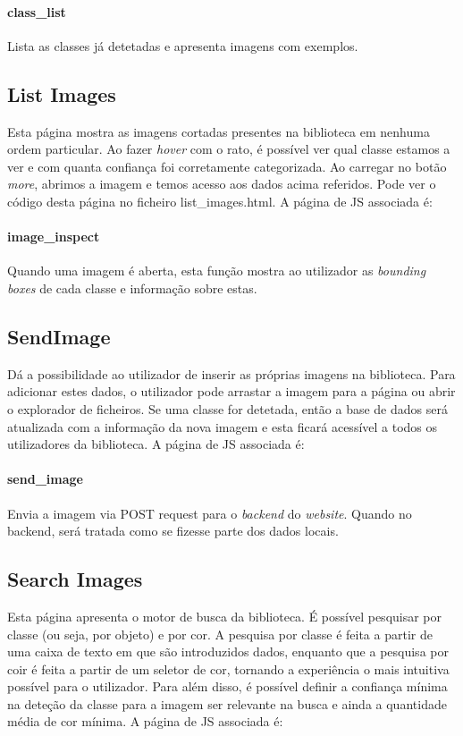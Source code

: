 \documentclass{report}
\begin{document}
\paragraph{class\_list} 
Lista as classes já detetadas e apresenta imagens com exemplos.

\subsection{List Images}
Esta página mostra as imagens cortadas presentes na biblioteca em nenhuma ordem particular. Ao fazer \textit{hover} com o rato, é possível ver qual classe estamos a ver e com quanta confiança foi corretamente categorizada. Ao carregar no botão \textit{more}, abrimos a imagem e temos acesso aos dados acima referidos. Pode ver o código desta página no ficheiro list\_images.html. A página de JS associada é:
\paragraph{image\_inspect}
Quando uma imagem é aberta, esta função mostra ao utilizador as \textit{bounding boxes} de cada classe e informação sobre estas. 

\subsection{SendImage}
Dá a possibilidade ao utilizador de inserir as próprias imagens na biblioteca. Para adicionar estes dados, o utilizador pode arrastar a imagem para a página ou abrir o explorador de ficheiros. Se uma classe for detetada, então a base de dados será atualizada com a informação da nova imagem e esta ficará acessível a todos os utilizadores da biblioteca. A página de JS associada é:
\paragraph{send\_image}
Envia a imagem via POST request para o \textit{backend} do \textit{website}. Quando no backend, será tratada como se fizesse parte dos dados locais.

\subsection{Search Images}
Esta página apresenta o motor de busca da biblioteca. É possível pesquisar por classe (ou seja, por objeto) e por cor. A pesquisa por classe é feita a partir de uma caixa de texto em que são introduzidos dados, enquanto que a pesquisa por coir é feita a partir de um seletor de cor, tornando a experiência o mais intuitiva possível para o utilizador. Para além disso, é possível definir a confiança mínima na deteção da classe para a imagem ser relevante na busca e ainda a quantidade média de cor mínima. A página de JS associada é:
\end{document}
